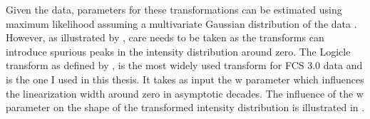 Given the data, parameters for these transformations can be estimated using maximum likelihood assuming a multivariate Gaussian distribution of the data \citep{Finak:2010is}. 
However, as illustrated by \citet{Tung:2006uw}, care needs to be taken as the transforms can introduce spurious peaks in the intensity distribution around zero.
The Logicle transform as defined by \citet{Parks:2006gaa},
is the most widely used transform for FCS 3.0 data and is the one I used in this thesis.
It takes as input the w parameter which influences the linearization width around zero in asymptotic decades.
The influence of the w parameter on the shape of the transformed intensity distribution is illustrated in .
